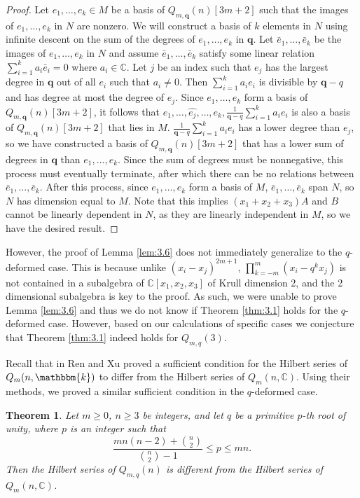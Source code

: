 \documentclass[11pt]{article}
\newtheorem{theorem}{Theorem}[section]
\theoremstyle{definition}
\renewcommand{\k}{\mathbbm{k}}
\newcommand{\C}{\mathbb{C}}
\renewcommand{\b}[1]{\textbf{#1}}
\begin{document}
\begin{proof}
    Let $e_1,\dots,e_k\in M$ be a basis of $Q_{m,\b{q}}(n)[3m+2]$ such that the images of $e_1,\dots,e_k$ in $N$ are nonzero. We will construct a basis of $k$ elements in $N$ using infinite descent on the sum of the degrees of $e_1,\dots,e_k$ in $\b{q}$. Let $\bar{e}_1,\dots,\bar{e}_k$ be the images of $e_1,\dots,e_k$ in $N$ and assume $\bar{e}_1,\dots,\bar{e}_k$ satisfy some linear relation $\sum_{i=1}^ka_i\bar{e}_i=0$ where $a_i\in\C$. Let $j$ be an index such that $e_j$ has the largest degree in $\b{q}$ out of all $e_i$ such that $a_i\neq 0$. Then $\sum_{i=1}^ka_ie_i$ is divisible by $\b{q}-q$ and has degree at most the degree of $e_j$. Since $e_1,\dots,e_k$ form a basis of $Q_{m,\b{q}}(n)[3m+2]$, it follows that  $e_1,\dots,\hat{e_j},\dots,e_k,\frac{1}{\b{q}-q}\sum_{i=1}^ka_ie_i$ is also a basis of $Q_{m,\b{q}}(n)[3m+2]$ that lies in $M$. $\frac{1}{\b{q}-q}\sum_{i=1}^ka_ie_i$ has a lower degree than $e_j$, so we have constructed a basis of $Q_{m,\b{q}}(n)[3m+2]$ that has a lower sum of degrees in $\b{q}$ than $e_1,\dots,e_k$. Since the sum of degrees must be nonnegative, this process must eventually terminate, after which there can be no relations between $\bar{e}_1,\dots,\bar{e}_k$. After this process, since $e_1,\dots,e_k$ form a basis of $M$, $\bar{e}_1,\dots,\bar{e}_k$ span $N$, so $N$ has dimension equal to $M$. Note that this implies $(x_1+x_2+x_3)A$ and $B$ cannot be linearly dependent in $N$, as they are linearly independent in $M$, so we have the desired result.
\end{proof}

However, the proof of Lemma \ref{lem:3.6} does not immediately generalize to the $q$-deformed case. This is because unlike $(x_i-x_j)^{2m+1}$, $\prod_{k=-m}^m(x_i-q^kx_j)$ is not contained in a subalgebra of $\C[x_1,x_2,x_3]$ of Krull dimension 2, and the 2 dimensional subalgebra is key to the proof. As such, we were unable to prove Lemma \ref{lem:3.6} and thus we do not know if Theorem \ref{thm:3.1} holds for the $q$-deformed case. However, based on our calculations of specific cases we conjecture that Theorem \ref{thm:3.1} indeed holds for $Q_{m,q}(3)$. 

Recall that in \cite{Ren_2020} Ren and Xu proved a sufficient condition for the Hilbert series of $Q_m(n,\k)$ to differ from the Hilbert series of $Q_m(n,\C)$. Using their methods, we proved a similar sufficient condition in the $q$-deformed case.

\begin{theorem}\label{thm:5.6}
    Let $m\geq0$, $n\geq 3$ be integers, and let $q$ be a primitive $p$-th root of unity, where $p$ is an integer such that
    $$\frac{mn(n-2)+{n\choose{2}}}{{n\choose{2}}-1}\leq p\leq mn.$$
    Then the Hilbert series of $Q_{m,q}(n)$ is different from the Hilbert series of $Q_m(n,\C)$.
\end{theorem}
\end{document}
